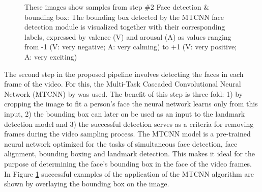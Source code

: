 \begin{figure}[htbp]
  \hfill
  \caption[ER pipeline step \#2: Face detection \& bounding box]{These images show samples from step \#2 Face detection \& bounding box: The bounding box detected by the MTCNN \citep{Zhang:2016:MTCCN} face detection module is visualized together with their corresponding labels, expressed by valence (V) and arousal (A) as values ranging from -1 (V: very negative; A: very calming) to +1 (V: very positive; A: very exciting)}
  \label{fig:MethodologyBoundingBox}
\end{figure}

The second step in the proposed pipeline involves detecting the faces in each frame of the video. For this, the Multi-Task Cascaded Convolutional Neural Network (MTCNN) by \citet{Zhang:2016:MTCCN} was used. The benefit of this step is three-fold: 1) by cropping the image to fit a person's face the neural network learns only from this input, 2) the bounding box can later on be used as an input to the landmark detection model and 3) the successful detection serves as a criteria for removing frames during the video sampling process.
\newline\newline
The MTCNN \citep{Zhang:2016:MTCCN} model is a pre-trained neural network optimized for the tasks of simultaneous face detection, face alignment, bounding boxing and landmark detection. This makes it ideal for the purpose of determining the face's bounding box in the face of the video frames. In Figure \ref{fig:MethodologyBoundingBox} successful examples of the application of the MTCNN algorithm are shown by overlaying the bounding box on the image.

\vspace{0.5cm}
